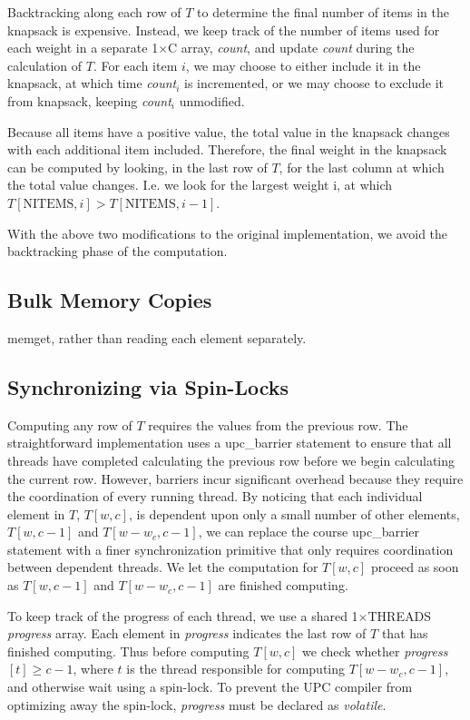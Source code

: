 \documentclass[11pt]{article} %
\begin{document}
Backtracking along each row of $T$ to determine the final number of items in the knapsack is expensive. Instead, we keep track of the number of items used for each weight in a separate 1$\times$C array, \emph{count}, and update \emph{count} during the calculation of $T$. For each item $i$, we may choose to either include it in the knapsack, at which time \emph{count}$_i$ is incremented, or we may choose to exclude it from knapsack, keeping \emph{count}$_i$ unmodified.

Because all items have a positive value, the total value in the knapsack changes with each additional item included. Therefore, the final weight in the knapsack can be computed by looking, in the last row of $T$, for the last column at which the total value changes. I.e. we look for the largest weight i, at which $T[\text{NITEMS}, i] > T[\text{NITEMS}, i-1]$.

With the above two modifications to the original implementation, we avoid the backtracking phase of the computation.

\subsection{Bulk Memory Copies}

memget, rather than reading each element separately.

\subsection{Synchronizing via Spin-Locks}

Computing any row of $T$ requires the values from the previous row. The straightforward implementation uses a upc\_barrier statement to ensure that all threads have completed calculating the previous row before we begin calculating the current row. However, barriers incur significant overhead because they require the coordination of every running thread. By noticing that each individual element in $T$, $T[w,c]$, is dependent upon only a small number of other elements, $T[w,c-1]$ and $T[w-w_c,c-1]$, we can replace the course upc\_barrier statement with a finer synchronization primitive that only requires coordination between dependent threads. We let the computation for $T[w,c]$ proceed as soon as $T[w,c-1]$ and $T[w-w_c,c-1]$ are finished computing.

To keep track of the progress of each thread, we use a shared 1$\times$THREADS \emph{progress} array. Each element in \emph{progress} indicates the last row of $T$ that has finished computing. Thus before computing $T[w,c]$ we check whether \emph{progress}$[t] \geq c-1$, where $t$ is the thread responsible for computing $T[w-w_c,c-1]$, and otherwise wait using a spin-lock. To prevent the UPC compiler from optimizing away the spin-lock, \emph{progress} must be declared as \emph{volatile}.
\end{document}
